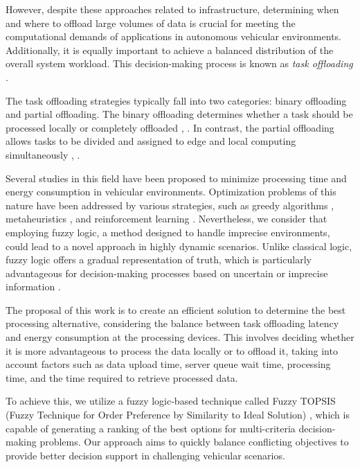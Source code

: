 \documentclass[iicol]{sn-jnl}
\begin{document}
However, despite these approaches related to infrastructure, determining when and where to offload large volumes of data is crucial for meeting the computational demands of applications in autonomous vehicular environments. Additionally, it is equally important to achieve a balanced distribution of the overall system workload. This decision-making process is known as \textit{task offloading} \cite{kumari2022task}.

The task offloading strategies typically fall into two categories: binary offloading and partial offloading. The binary offloading determines whether a task should be processed locally or completely offloaded \cite{duan2024binary}, \cite{guo2023intelligent}. In contrast, the partial offloading allows tasks to be divided and assigned to edge and local computing simultaneously \cite{kuang2019partial}, \cite{ren2017partial}.

Several studies in this field have been proposed to minimize processing time and energy consumption in vehicular environments. Optimization problems of this nature have been addressed by various strategies, such as greedy algorithms \cite{de2022context}, metaheuristics \cite{abuthahir2024tasks}, and reinforcement learning \cite{fofana2024intelligent}. Nevertheless, we consider that employing fuzzy logic, a method designed to handle imprecise environments, could lead to  a novel approach in highly dynamic scenarios. Unlike classical logic, fuzzy logic offers a gradual representation of truth, which is particularly advantageous for decision-making processes based on uncertain or imprecise information \cite{zadeh1965fuzzy}.

The proposal of this work is to create an efficient solution to determine the best processing alternative, considering the balance between task offloading latency and energy consumption at the processing devices. This involves deciding whether it is more advantageous to process the data locally or to offload it, taking into account factors such as data upload time, server queue wait time, processing time, and the time required to retrieve processed data.

To achieve this, we utilize a fuzzy logic-based technique called Fuzzy TOPSIS (Fuzzy Technique for Order Preference by Similarity to Ideal Solution) \cite{CHEN20001}, which is capable of generating a ranking of the best options for multi-criteria decision-making problems. Our approach aims to quickly balance conflicting objectives to provide better decision support in challenging vehicular scenarios.
\end{document}
